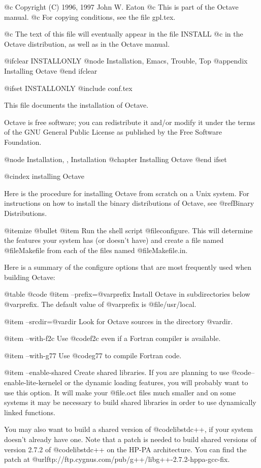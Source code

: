 @c Copyright (C) 1996, 1997 John W. Eaton
@c This is part of the Octave manual.
@c For copying conditions, see the file gpl.tex.

@c The text of this file will eventually appear in the file INSTALL
@c in the Octave distribution, as well as in the Octave manual.

@ifclear INSTALLONLY
@node Installation, Emacs, Trouble, Top
@appendix Installing Octave
@end ifclear

@ifset INSTALLONLY
@include conf.tex

This file documents the installation of Octave.

Octave is free software; you can redistribute it and/or modify it
under the terms of the GNU General Public License as published by the
Free Software Foundation.

@node Installation, , Installation
@chapter Installing Octave
@end ifset

@cindex installing Octave

Here is the procedure for installing Octave from scratch on a Unix
system.  For instructions on how to install the binary distributions of
Octave, see @ref{Binary Distributions}.

@itemize @bullet
@item
Run the shell script @file{configure}.  This will determine the features
your system has (or doesn't have) and create a file named
@file{Makefile} from each of the files named @file{Makefile.in}.

Here is a summary of the configure options that are most frequently used
when building Octave:

@table @code
@item --prefix=@var{prefix}
Install Octave in subdirectories below @var{prefix}.  The default value
of @var{prefix} is @file{/usr/local}.

@item --srcdir=@var{dir}
Look for Octave sources in the directory @var{dir}.

@item --with-f2c
Use @code{f2c} even if a Fortran compiler is available.

@item --with-g77
Use @code{g77} to compile Fortran code.

@item --enable-shared
Create shared libraries.  If you are planning to use
@code{--enable-lite-kernelel} or the dynamic loading features, you will
probably want to use this option.  It will make your @file{.oct} files
much smaller and on some systems it may be necessary to build shared
libraries in order to use dynamically linked functions.

You may also want to build a shared version of @code{libstdc++}, if your
system doesn't already have one.  Note that a patch is needed to build
shared versions of version 2.7.2 of @code{libstdc++} on the HP-PA
architecture.  You can find the patch at
@url{ftp://ftp.cygnus.com/pub/g++/libg++-2.7.2-hppa-gcc-fix}.

